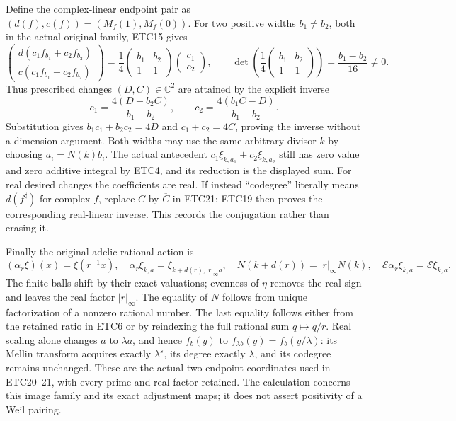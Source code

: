 \documentclass[11pt]{article}
\begin{document}
Define the complex-linear endpoint pair as
$(d(f),c(f))=(M_f(1),M_f(0))$. For two positive widths
$b_1\ne b_2$, both in the actual original family, ETC15 gives
\begin{equation}\tag{ETC20}
 \begin{pmatrix}d(c_1f_{b_1}+c_2f_{b_2})\\
                 c(c_1f_{b_1}+c_2f_{b_2})\end{pmatrix}
 =\frac14\begin{pmatrix}b_1&b_2\\1&1\end{pmatrix}
             \begin{pmatrix}c_1\\c_2\end{pmatrix},\qquad
 \det\left(\frac14\begin{pmatrix}b_1&b_2\\1&1\end{pmatrix}\right)
 =\frac{b_1-b_2}{16}\ne0.
\end{equation}
Thus prescribed changes $(D,C)\in\mathbb C^2$ are attained by
the explicit inverse
\begin{equation}\tag{ETC21}
 c_1=\frac{4(D-b_2C)}{b_1-b_2},\qquad
 c_2=\frac{4(b_1C-D)}{b_1-b_2}.
\end{equation}
Substitution gives $b_1c_1+b_2c_2=4D$ and $c_1+c_2=4C$,
proving the inverse without a dimension argument. Both widths may
use the same arbitrary divisor $k$ by choosing $a_i=N(k)b_i$.
The actual antecedent
$c_1\xi_{k,a_1}+c_2\xi_{k,a_2}$ still has zero value and zero
additive integral by ETC4, and its reduction is the displayed sum.
For real desired changes the coefficients are real. If instead
``codegree'' literally means $d(f^\sharp)$ for complex $f$,
replace $C$ by $\overline C$ in ETC21; ETC19 then proves the
corresponding real-linear inverse. This records the conjugation
rather than erasing it.

Finally the original adelic rational action is
\begin{equation}\tag{ETC22}
 (\alpha_r\xi)(x)=\xi(r^{-1}x),\quad
 \alpha_r\xi_{k,a}=\xi_{k+d(r),|r|_\infty a},\quad
 N(k+d(r))=|r|_\infty N(k),\quad
 \mathcal E\alpha_r\xi_{k,a}=\mathcal E\xi_{k,a}.
\end{equation}
The finite balls shift by their exact valuations; evenness of $\eta$
removes the real sign and leaves the real factor $|r|_\infty$.
The equality of $N$ follows from unique factorization of a nonzero
rational number. The last equality follows either from the retained
ratio in ETC6 or by reindexing the full rational sum $q\mapsto q/r$.
Real scaling alone changes $a$ to $\lambda a$, and hence
$f_b(y)$ to $f_{\lambda b}(y)=f_b(y/\lambda)$: its Mellin transform
acquires exactly $\lambda^s$, its degree exactly $\lambda$, and its
codegree remains unchanged. These are the actual two endpoint
coordinates used in ETC20--21, with every prime and real factor
retained. The calculation concerns this image family and its exact
adjustment maps; it does not assert positivity of a Weil pairing.
\end{document}
